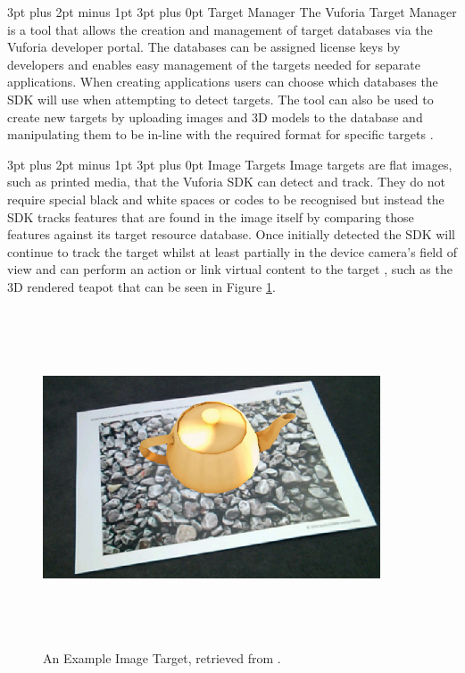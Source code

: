 \documentclass[12pt,a4paper,oneside]{article}
\makeatletter
\renewcommand\paragraph{\@startsection {paragraph}{1}{0mm} %
	                           {3pt plus 2pt minus 1pt} %
	                           {3pt plus 0pt} %
	                           {\normalfont}}
\makeatother
\begin{document}
\paragraph{Target Manager}
The Vuforia Target Manager is a tool that allows the creation and management of target databases via the Vuforia developer portal. The databases can be assigned license keys by developers and enables easy management of the targets needed for separate applications. When creating applications users can choose which databases the SDK will use when attempting to detect targets. The tool can also be used to create new targets by uploading images and 3D models to the database and manipulating them to be in-line with the required format for specific targets \cite{vuforiatargetmanager}. 

\paragraph{Image Targets}
Image targets are flat images, such as printed media, that the Vuforia SDK can detect and track. They do not require special black and white spaces or codes to be recognised but instead the SDK tracks features that are found in the image itself by comparing those features against its target resource database. 
Once initially detected the SDK will continue to track the target whilst at least partially in the device camera's field of view and can perform an action or link virtual content to the target \cite{vuforiaimagetargets}, such as the 3D rendered teapot that can be seen in Figure \ref{fig_imagetarget}.

\begin{figure}[!h]
	\centering
	\includegraphics[width=10cm,height=10cm,keepaspectratio]{images/imagetarget}
	\caption[Example Image Target]{An Example Image Target, retrieved from \footnotemark.}
	\label{fig_imagetarget}
\end{figure}
\end{document}

